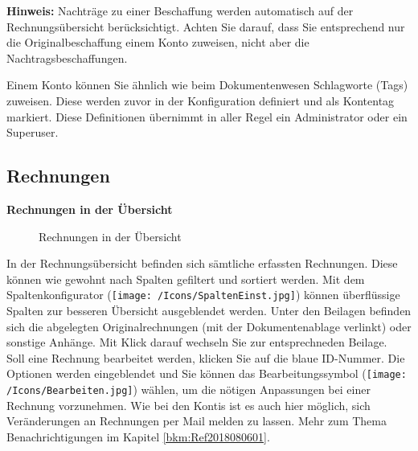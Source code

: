 \vspace{\baselineskip}

\textbf{Hinweis:} Nachträge zu einer Beschaffung werden automatisch auf der Rechnungsübersicht berücksichtigt. Achten Sie darauf, dass Sie entsprechend nur die Originalbeschaffung einem Konto zuweisen, nicht aber die Nachtragsbeschaffungen.

\vspace{\baselineskip}

Einem Konto können Sie ähnlich wie beim Dokumentenwesen Schlagworte (Tags) zuweisen. Diese werden zuvor in der Konfiguration definiert und als Kontentag markiert. Diese Definitionen übernimmt in aller Regel ein Administrator oder ein Superuser.

\subsection{Rechnungen}

\textbf{Rechnungen in der Übersicht}

\begin{figure}[H]
\caption{Rechnungen in der Übersicht}
\end{figure}

In der Rechnungsübersicht befinden sich sämtliche erfassten Rechnungen. Diese können wie gewohnt nach Spalten gefiltert und sortiert werden. Mit dem Spaltenkonfigurator (\texttt{[image: /Icons/SpaltenEinst.jpg]}) können überflüssige Spalten zur besseren Übersicht ausgeblendet werden. Unter den Beilagen befinden sich die abgelegten Originalrechnungen (mit der Dokumentenablage verlinkt) oder sonstige Anhänge. Mit Klick darauf wechseln Sie zur entsprechneden Beilage.\\
Soll eine Rechnung bearbeitet werden, klicken Sie auf die blaue ID-Nummer. Die Optionen werden eingeblendet und Sie können das Bearbeitungssymbol (\texttt{[image: /Icons/Bearbeiten.jpg]}) wählen, um die nötigen Anpassungen bei einer Rechnung vorzunehmen. Wie bei den Kontis ist es auch hier möglich, sich Veränderungen an Rechnungen per Mail melden zu lassen. Mehr zum Thema Benachrichtigungen im Kapitel \ref{bkm:Ref2018080601}.

